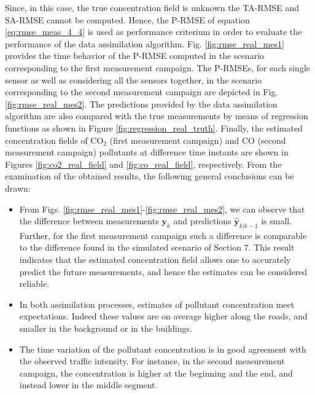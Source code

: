 \documentclass[journal]{IEEEtran}
\newcommand{\mb}{\mathbf}
\begin{document}
Since, in this case, the true concentration field is unknown the TA-RMSE and SA-RMSE cannot be computed. Hence, the P-RMSE of equation \eqref{eq:rmse_meas_4_4} is used as performance criterium
in order to evaluate the performance of the data assimilation algorithm. Fig. \ref{fig:rmse_real_mes1} provides the time behavior of the P-RMSE computed in the scenario corresponding to the first measurement campaign. The P-RMSEs, for each single sensor as well as considering all the sensors together, in the scenario corresponding to the second measurement
campaign are depicted in Fig. \ref{fig:rmse_real_mes2}.
The predictions provided by the data assimilation algorithm are also compared with the true measurements by means of regression functions as shown in Figure \ref{fig:regression_real_truth}.
Finally, the estimated concentration fields of CO$_2$ (first measurement campaign) and CO (second measurement campaign) pollutants at difference time instants are shown in Figures \ref{fig:co2_real_field} and \ref{fig:co_real_field}, respectively. From the examination of the obtained results, the following general conclusions can be drawn:
\begin{itemize}
\item From Figs. \ref{fig:rmse_real_mes1}-\ref{fig:rmse_real_mes2}, we can observe that the difference between measurements $\mb{y}_{k}$ and predictions $\hat{\mb{y}}_{k|k-1}$ is small. Further, for the first measurement campaign such a difference is comparable to the difference found in the simulated scenario of Section 7. This result indicates that the estimated concentration field allows one to accurately predict the future measurements, and hence the estimates can be considered reliable.
\item In both assimilation processes, estimates of pollutant concentration meet expectations. Indeed these values are on average higher along the roads, and smaller in the background or in the buildings.
\item The time variation of the pollutant concentration is in good agreement with the observed traffic intensity. For instance, in the second measurement campaign, the concentration is higher at the beginning and the end, and instead lower in the middle segment.
\end{itemize}
\end{document}

